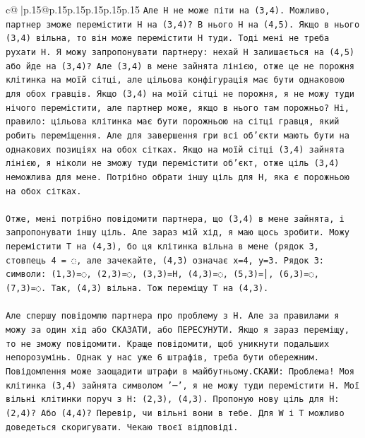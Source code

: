 \documentclass{article}
\begin{document}
{\begin{supertabular}{c@{$\;$}|p{.15\linewidth}@{}p{.15\linewidth}p{.15\linewidth}p{.15\linewidth}p{.15\linewidth}p{.15\linewidth}}
{{{\texttt{Але H не може піти на (3,4). Можливо, партнер зможе перемістити H на (3,4)? В нього H на (4,5). Якщо в нього (3,4) вільна, то він може перемістити H туди. Тоді мені не треба рухати H. Я можу запропонувати партнеру: нехай H залишається на (4,5) або йде на (3,4)? Але (3,4) в мене зайнята лінією, отже це не порожня клітинка на моїй сітці, але цільова конфігурація має бути однаковою для обох гравців. Якщо (3,4) на моїй сітці не порожня, я не можу туди нічого перемістити, але партнер може, якщо в нього там порожньо? Ні, правило: цільова клітинка має бути порожньою на сітці гравця, який робить переміщення. Але для завершення гри всі об'єкти мають бути на однакових позиціях на обох сітках. Якщо на моїй сітці (3,4) зайнята лінією, я ніколи не зможу туди перемістити об'єкт, отже ціль (3,4) неможлива для мене. Потрібно обрати іншу ціль для H, яка є порожньою на обох сітках.} \\
\\ 
\texttt{Отже, мені потрібно повідомити партнера, що (3,4) в мене зайнята, і запропонувати іншу ціль. Але зараз мій хід, я маю щось зробити. Можу перемістити T на (4,3), бо ця клітинка вільна в мене (рядок 3, стовпець 4 = ◌, але зачекайте, (4,3) означає x=4, y=3. Рядок 3: символи: (1,3)=◌, (2,3)=◌, (3,3)=H, (4,3)=◌, (5,3)=│, (6,3)=◌, (7,3)=◌. Так, (4,3) вільна. Тож переміщу T на (4,3).} \\
\\ 
\texttt{Але спершу повідомлю партнера про проблему з H. Але за правилами я можу за один хід або СКАЗАТИ, або ПЕРЕСУНУТИ. Якщо я зараз переміщу, то не зможу повідомити. Краще повідомити, щоб уникнути подальших непорозумінь. Однак у нас уже 6 штрафів, треба бути обережним. Повідомлення може заощадити штрафи в майбутньому.СКАЖИ: Проблема! Моя клітинка (3,4) зайнята символом '─', я не можу туди перемістити H. Мої вільні клітинки поруч з H: (2,3), (4,3). Пропоную нову ціль для H: (2,4)? Або (4,4)? Перевір, чи вільні вони в тебе. Для W і T можливо доведеться скоригувати. Чекаю твоєї відповіді.} \\
            }
        }
    }
     \\ \\


\end{supertabular}}
\end{document}
